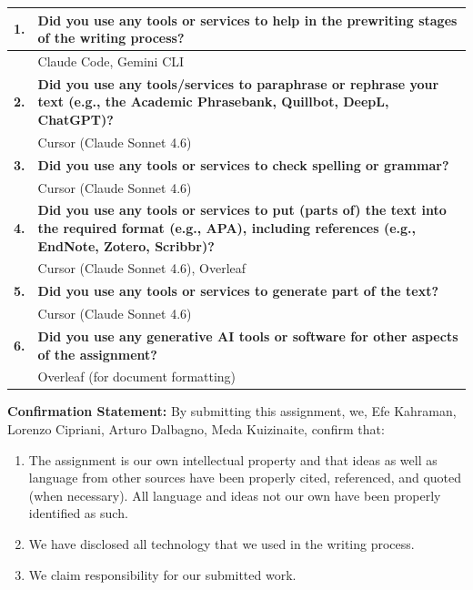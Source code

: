 \documentclass[12pt]{article}
\begin{document}
\begin{tabularx}{\textwidth}{|l|X|}
\hline
\textbf{1.} & \textbf{Did you use any tools or services to help in the prewriting
              stages of the writing process?} \\
\hline
            & Claude Code, Gemini CLI \\
\hline
\textbf{2.} & \textbf{Did you use any tools/services to paraphrase or rephrase
              your text (e.g., the Academic Phrasebank, Quillbot, DeepL, ChatGPT)?} \\
\hline
            & Cursor (Claude Sonnet 4.6) \\
\hline
\textbf{3.} & \textbf{Did you use any tools or services to check spelling or grammar?} \\
\hline
            & Cursor (Claude Sonnet 4.6) \\
\hline
\textbf{4.} & \textbf{Did you use any tools or services to put (parts of) the text
              into the required format (e.g., APA), including references
              (e.g., EndNote, Zotero, Scribbr)?} \\
\hline
            & Cursor (Claude Sonnet 4.6), Overleaf \\
\hline
\textbf{5.} & \textbf{Did you use any tools or services to generate part of the text?} \\
\hline
            & Cursor (Claude Sonnet 4.6) \\
\hline
\textbf{6.} & \textbf{Did you use any generative AI tools or software for other
              aspects of the assignment?} \\
\hline
            & Overleaf (for document formatting) \\
\hline
\end{tabularx}

\vspace{24pt}

\noindent\textbf{Confirmation Statement:} By submitting this assignment, we,
Efe Kahraman, Lorenzo Cipriani, Arturo Dalbagno, Meda Kuizinaite, confirm that:

\begin{enumerate}
  \item The assignment is our own intellectual property and that ideas as well
        as language from other sources have been properly cited, referenced,
        and quoted (when necessary). All language and ideas not our own have
        been properly identified as such.
  \item We have disclosed all technology that we used in the writing process.
  \item We claim responsibility for our submitted work.
\end{enumerate}
\end{document}
